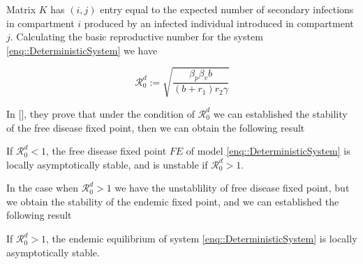 Matrix $K$  has $(i, j)$ entry equal to the expected number of secondary infections in compartment $i$ produced by an infected individual introduced in compartment $j$. Calculating the basic reproductive number for the system \eqref{enq::DeterministicSystem} we have

\begin{equation}\label{Mtx::NextGenerationMatrix}
    \mathcal{R}^d_0:=\sqrt{\frac{\beta_p \beta_v b}{(b + r_1 ) r_2 \gamma}}
\end{equation}

In [], they prove that under the condition of $\mathcal{R}^d_0$ we can established the stability of the free disease fixed point, then we can obtain the following result

\begin{theorem}\label{Thm::StabilityFreePointBasicReproNumberDeter}
If $\mathcal{R}^d_0 < 1$, the free disease fixed point $FE$ of model \eqref{enq::DeterministicSystem} is locally asymptotically stable, and is unstable if $\mathcal{R}^d_0>1$.
\end{theorem}

In the case when $\mathcal{R}^d_0>1$ we have the unstablility of free disease fixed point, but we obtain the stability of the endemic fixed point, and we can established the following result

\begin{theorem}\label{Thm::StabilityEndemicPointBasicReproNumberDeter}
If $\mathcal{R}^d_0>1$, the endemic equilibrium  of system \eqref{enq::DeterministicSystem} is locally asymptotically stable.
\end{theorem}
